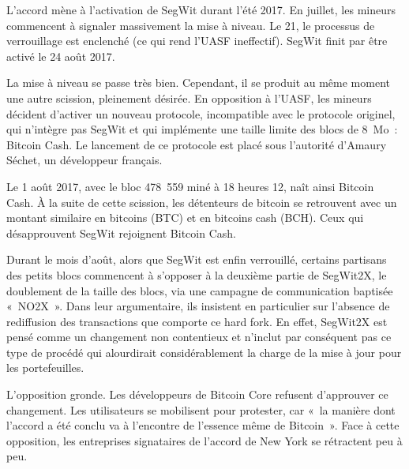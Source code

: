 L'accord mène à l'activation de SegWit durant l'été 2017. En juillet, les mineurs commencent à signaler massivement la mise à niveau. Le 21, le processus de verrouillage est enclenché (ce qui rend l'UASF ineffectif). SegWit finit par être activé le 24 août 2017.

La mise à niveau se passe très bien. Cependant, il se produit au même moment une autre scission, pleinement désirée. En opposition à l'UASF, les mineurs décident d'activer un nouveau protocole, incompatible avec le protocole originel, qui n'intègre pas SegWit et qui implémente une taille limite des blocs de 8~Mo~: Bitcoin Cash. Le lancement de ce protocole est placé sous l'autorité d'Amaury Séchet, un développeur français.

Le 1\ier{} août 2017, avec le bloc 478~559 miné à 18 heures 12, naît ainsi Bitcoin Cash. À la suite de cette scission, les détenteurs de bitcoin se retrouvent avec un montant similaire en bitcoins (BTC) et en bitcoins cash (BCH). Ceux qui désapprouvent SegWit rejoignent Bitcoin Cash.

Durant le mois d'août, alors que SegWit est enfin verrouillé, certains partisans des petits blocs commencent à s'opposer à la deuxième partie de SegWit2X, le doublement de la taille des blocs, via une campagne de communication baptisée «~NO2X~». Dans leur argumentaire, ils insistent en particulier sur l'absence de rediffusion des transactions que comporte ce hard fork. En effet, SegWit2X est pensé comme un changement non contentieux et n'inclut par conséquent pas ce type de procédé qui alourdirait considérablement la charge de la mise à jour pour les portefeuilles.

L'opposition gronde. Les développeurs de Bitcoin Core refusent d'approuver ce changement. Les utilisateurs se mobilisent pour protester, car «~la manière dont l'accord a été conclu va à l'encontre de l'essence même de Bitcoin~». Face à cette opposition, les entreprises signataires de l'accord de New York se rétractent peu à peu.

